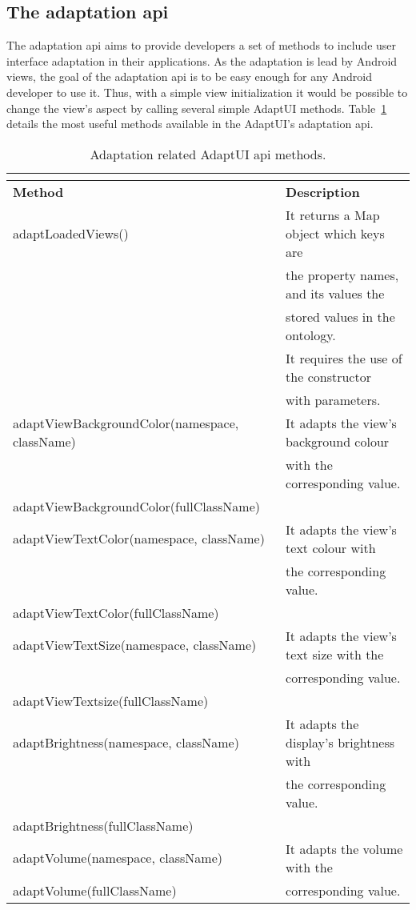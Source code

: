 \subsection{The adaptation \ac{api}}
\label{sec:adaptation_api}

The adaptation \ac{api} aims to provide developers a set of methods to include
user interface adaptation in their applications. As the adaptation is lead by
Android views, the goal of the adaptation \ac{api} is to be easy enough for
any Android developer to use it. Thus, with a simple view initialization
it would be possible to change the view's aspect by calling several simple 
AdaptUI methods. Table~\ref{tbl:api_adaptation} details the most useful methods 
available in the AdaptUI's adaptation \ac{api}.

\begin{center}
\footnotesize
\begin{longtable}{l l}
  \caption{Adaptation related AdaptUI \ac{api} methods.}\\
  \label{tbl:api_adaptation} \\
  \hline 
  \textbf{Method}				& \textbf{Description}			\\
  \hline
  adaptLoadedViews()				& It returns a Map object which keys are\\
						& the property names, and its values the\\
						& stored values in the ontology.	\\
						& It requires the use of the constructor\\
						& with parameters.			\\
  adaptViewBackgroundColor(namespace, className)& It adapts the view's background colour\\
						& with the corresponding value.		\\
  adaptViewBackgroundColor(fullClassName)	& 					\\
  adaptViewTextColor(namespace, className)	& It adapts the view's text colour with \\
						& the corresponding value.		\\
  adaptViewTextColor(fullClassName)		&					\\
  adaptViewTextSize(namespace, className)	& It adapts the view's text size with the\\
						& corresponding value.			\\
  adaptViewTextsize(fullClassName)		&					\\
  adaptBrightness(namespace, className)		& It adapts the display's brightness with\\
						& the corresponding value.		\\
  adaptBrightness(fullClassName)		& 					\\
  adaptVolume(namespace, className)		& It adapts the volume with the 	\\
  adaptVolume(fullClassName)			& corresponding value.			\\
  \hline
\end{longtable}
\end{center}


